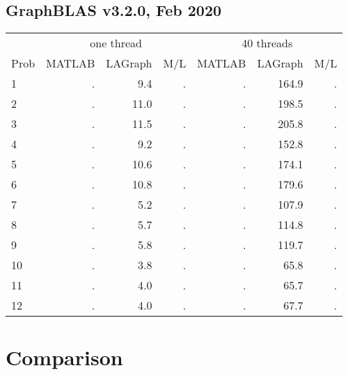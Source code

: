 \documentclass[12pt]{article}
\begin{document}
\subsection{GraphBLAS v3.2.0, Feb 2020}

{\small
\begin{tabular}{l|rr|r||rr|r}
\hline
     & \multicolumn{3}{c}{one thread}                &  \multicolumn{3}{c}{40 threads}  \\
Prob & MATLAB         & LAGraph        & M/L         &   MATLAB      & LAGraph       & M/L        \\
\hline
  1  &{           .  }& {         9.4 }&        .    &  {        .  }& {      164.9 }&      .     \\
  2  &{           .  }& {        11.0 }&        .    &  {        .  }& {      198.5 }&      .     \\
  3  &{           .  }& {        11.5 }&        .    &  {        .  }& {      205.8 }&      .     \\
\hline
  4  &{           .  }& {         9.2 }&        .    &  {        .  }& {      152.8 }&      .     \\
  5  &{           .  }& {        10.6 }&        .    &  {        .  }& {      174.1 }&      .     \\
  6  &{           .  }& {        10.8 }&        .    &  {        .  }& {      179.6 }&      .     \\
\hline
  7  &{           .  }& {         5.2 }&        .    &  {        .  }& {      107.9 }&      .     \\
  8  &{           .  }& {         5.7 }&        .    &  {        .  }& {      114.8 }&      .     \\
  9  &{           .  }& {         5.8 }&        .    &  {        .  }& {      119.7 }&      .     \\
\hline
 10  &{           .  }& {         3.8 }&        .    &  {        .  }& {       65.8 }&      .     \\
 11  &{           .  }& {         4.0 }&        .    &  {        .  }& {       65.7 }&      .     \\
 12  &{           .  }& {         4.0 }&        .    &  {        .  }& {       67.7 }&      .     \\
\end{tabular}
}

\section{Comparison}
\end{document}
